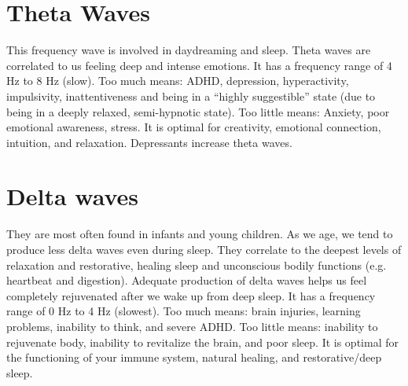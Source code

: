 \documentclass[12pt]{article}
\begin{document}
\section{Theta Waves} 
This frequency wave is involved in daydreaming and sleep.
Theta waves are correlated to us feeling deep and intense emotions.
It has a frequency range of 4 Hz to 8 Hz (slow).
Too much means: ADHD, depression, hyperactivity, impulsivity, inattentiveness and being in a “highly suggestible” state (due to being in a deeply relaxed, semi-hypnotic state).
Too little means: Anxiety, poor emotional awareness, stress.
It is optimal for creativity, emotional connection, intuition, and relaxation.
Depressants increase theta waves.

\section{Delta waves} 
They are most often found in infants and young children. As we age, we tend to produce less delta waves even during sleep.
They correlate to the deepest levels of relaxation and restorative, healing sleep and unconscious bodily functions (e.g. heartbeat and digestion).
Adequate production of delta waves helps us feel completely rejuvenated after we wake up from deep sleep.
It has a frequency range of 0 Hz to 4 Hz (slowest).
Too much means: brain injuries, learning problems, inability to think, and severe ADHD.
Too little means: inability to rejuvenate body, inability to revitalize the brain, and poor sleep.
It is optimal for the functioning of your immune system, natural healing, and restorative/deep sleep.
\end{document}
